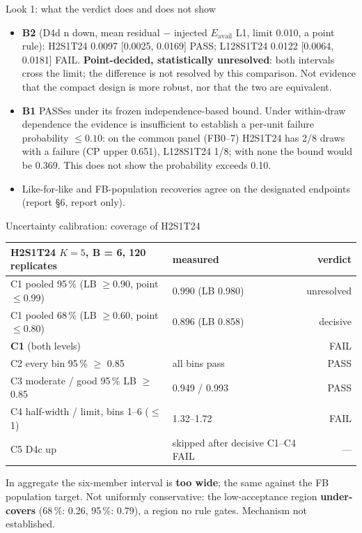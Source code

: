 \documentclass[aspectratio=169,10pt]{beamer}
\def\evidencetext{}
\begin{document}
\gdef\evidencetext{\texttt{results/final/decision\_look1.json}; \texttt{results/final/b1\_dependence\_look1.json}; \texttt{results/final/population\_look1.json}}
\begin{frame}{Look 1: what the verdict does and does not show}
\small\begin{itemize}\item \textbf{B2} (D4d n down, mean residual $-$ injected $E_\mathrm{avail}$ L1, limit 0.010, a point rule): H2S1T24 0.0097 [0.0025, 0.0169] PASS; L128S1T24 0.0122 [0.0064, 0.0181] FAIL. \textbf{Point-decided, statistically unresolved}: both intervals cross the limit; the difference is not resolved by this comparison. Not evidence that the compact design is more robust, nor that the two are equivalent.\item \textbf{B1} PASSes under its frozen independence-based bound. Under within-draw dependence the evidence is insufficient to establish a per-unit failure probability $\le 0.10$: on the common panel (FB0--7) H2S1T24 has 2/8 draws with a failure (CP upper 0.651), L128S1T24 1/8; with none the bound would be 0.369. This does not show the probability exceeds 0.10.\item Like-for-like and FB-population recoveries agree on the designated endpoints (report \S6, report only).\end{itemize}
\end{frame}

\gdef\evidencetext{\texttt{results/final/coverage\_dev/coverage\_H2S1T24K5.json}}
\begin{frame}{Uncertainty calibration: coverage of H2S1T24}
{\scriptsize
\begin{tabular}{llr}
\toprule
H2S1T24 $K{=}5$, B = 6, 120 replicates & measured & verdict \\
\midrule
C1 pooled 95\,\% (LB $\ge$0.90, point $\le$0.99) & 0.990 (LB 0.980) & unresolved \\
C1 pooled 68\,\% (LB $\ge$0.60, point $\le$0.80) & 0.896 (LB 0.858) & decisive \\
\textbf{C1} (both levels) &  & FAIL \\
C2 every bin 95\,\% $\ge$ 0.85 & all bins pass & PASS \\
C3 moderate / good 95\,\% LB $\ge$ 0.85 & 0.949 / 0.993 & PASS \\
C4 half-width / limit, bins 1--6 ($\le$1) & 1.32--1.72 & FAIL \\
C5 D4c up & skipped after decisive C1--C4 FAIL & --- \\
\bottomrule
\end{tabular}}\par\vspace{0.15cm}\small In aggregate the six-member interval is \textbf{too wide}; the same against the FB population target. Not uniformly conservative: the low-acceptance region \textbf{under-covers} (68\,\%: 0.26, 95\,\%: 0.79), a region no rule gates. Mechanism not established.
\end{frame}
\end{document}
